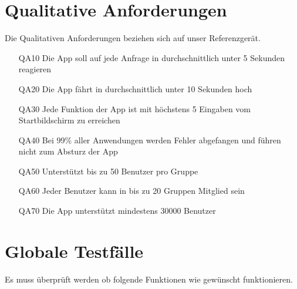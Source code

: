 \documentclass{scrartcl}
\begin{document}
	\newpage
	
	
	\section{Qualitative Anforderungen}
	Die Qualitativen Anforderungen beziehen sich auf unser Referenzgerät.
	\begin{itemize}
		\item[QA10] Die App soll auf jede Anfrage in durchschnittlich unter 5 Sekunden reagieren
		\item[QA20] Die App fährt in durchschnittlich unter 10 Sekunden hoch
		\item[QA30] Jede Funktion der App ist mit höchstens 5 Eingaben vom Startbildschirm zu erreichen
		\item[QA40] Bei 99\% aller Anwendungen werden Fehler abgefangen und führen nicht zum Absturz der App
		\item[QA50] Unterstützt bis zu 50 Benutzer pro Gruppe
		\item[QA60] Jeder Benutzer kann in bis zu 20 Gruppen \gls{Mitglied} sein
		\item[QA70] Die App unterstützt mindestens 30000 Benutzer
	\end{itemize}
	
	\newpage
	
	
	\section{Globale Testfälle}

	Es muss überprüft werden ob folgende Funktionen wie gewünscht funktionieren.
	
\end{document}
